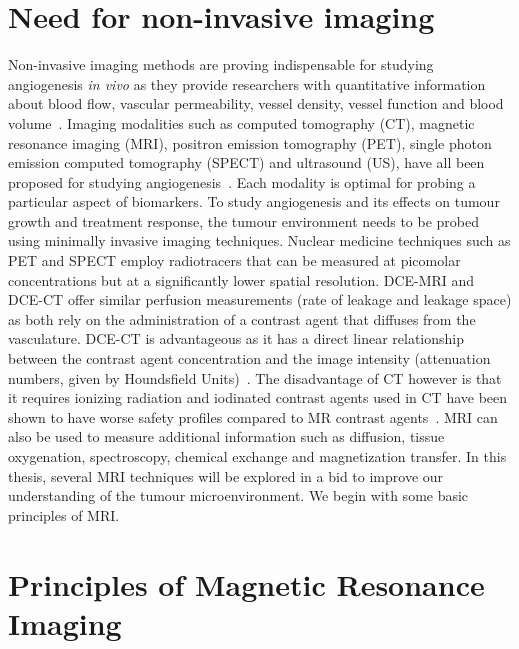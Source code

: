 \section{Need for non-invasive imaging}
Non-invasive imaging methods are proving indispensable for studying angiogenesis \emph{in vivo} as they provide researchers with quantitative information about blood flow, vascular permeability, vessel density, vessel function and blood volume~\cite{McDonald:2003cm}.
Imaging modalities such as computed tomography (CT), magnetic resonance imaging (MRI), positron emission tomography (PET), single photon emission computed tomography (SPECT) and ultrasound (US), have all been proposed for studying angiogenesis~\cite{Laking:2006ij}.
Each modality is optimal for probing a particular aspect of biomarkers. 
To study angiogenesis and its effects on tumour growth and treatment response, the tumour environment needs to be probed using minimally invasive imaging techniques. 
Nuclear medicine techniques such as PET and SPECT employ radiotracers that can be measured at picomolar concentrations but at a significantly lower spatial resolution.
DCE-MRI and DCE-CT offer similar perfusion measurements (rate of leakage and leakage space) as both rely on the administration of a contrast agent that diffuses from the vasculature.
DCE-CT is advantageous as it has a direct linear relationship between the contrast agent concentration and the image intensity (attenuation numbers, given by Houndsfield Units)~\cite{Cuenod:2006jy}.
The disadvantage of CT however is that it requires ionizing radiation and iodinated contrast agents used in CT have been shown to have worse safety profiles compared to MR contrast agents~\cite{Hasebroock:2009hw}.
MRI can also be used to measure additional information such as diffusion, tissue oxygenation, spectroscopy, chemical exchange and magnetization transfer. 
In this thesis, several MRI techniques will be explored in a bid to improve our understanding of the tumour microenvironment.
We begin with some basic principles of MRI.

\section{Principles of Magnetic Resonance Imaging}

